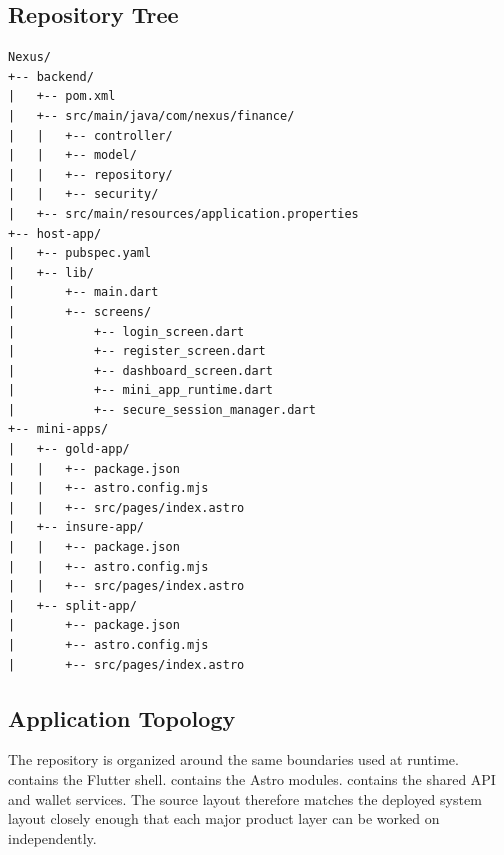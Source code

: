 \documentclass[11pt,a4paper]{article}
\newcommand{\code}[1]{\path{#1}}
\begin{document}
\subsection{Repository Tree}
\begin{lstlisting}[language={},caption={Overall workspace tree}]
Nexus/
+-- backend/
|   +-- pom.xml
|   +-- src/main/java/com/nexus/finance/
|   |   +-- controller/
|   |   +-- model/
|   |   +-- repository/
|   |   +-- security/
|   +-- src/main/resources/application.properties
+-- host-app/
|   +-- pubspec.yaml
|   +-- lib/
|       +-- main.dart
|       +-- screens/
|           +-- login_screen.dart
|           +-- register_screen.dart
|           +-- dashboard_screen.dart
|           +-- mini_app_runtime.dart
|           +-- secure_session_manager.dart
+-- mini-apps/
|   +-- gold-app/
|   |   +-- package.json
|   |   +-- astro.config.mjs
|   |   +-- src/pages/index.astro
|   +-- insure-app/
|   |   +-- package.json
|   |   +-- astro.config.mjs
|   |   +-- src/pages/index.astro
|   +-- split-app/
|       +-- package.json
|       +-- astro.config.mjs
|       +-- src/pages/index.astro
\end{lstlisting}

\subsection{Application Topology}
The repository is organized around the same boundaries used at runtime. \code{host-app/} contains the Flutter shell. \code{mini-apps/} contains the Astro modules. \code{backend/} contains the shared API and wallet services. The source layout therefore matches the deployed system layout closely enough that each major product layer can be worked on independently.
\end{document}
